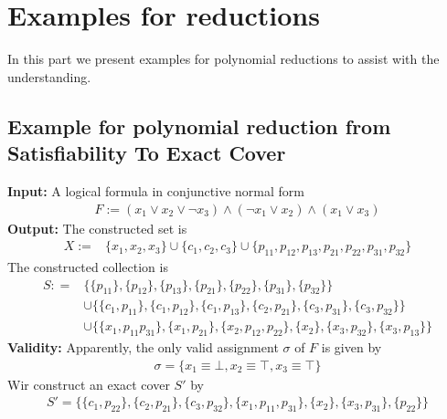 \chapter{Examples for reductions}
In this part we present examples for polynomial reductions to assist with the understanding. 
\section{Example for polynomial reduction from Satisfiability To Exact Cover}
\textbf{Input:} A logical formula in conjunctive normal form 
\begin{align*}
    F := (x_1 \lor x_2 \lor \neg x_3) \land (\neg x_1 \lor x_2) \land (x_1 \lor x_3)
\end{align*}
\textbf{Output:}
The constructed set is
\begin{align*}
    X := & \{ x_1 ,x_2, x_3\} \cup \{c_1, c_2, c_3\} \cup 
    \{p_{11}, p_{12}, p_{13}, p_{21}, p_{22}, p_{31}, p_{32}\}
\end{align*}
The constructed collection is 
\begin{align*}
    S : = & \{\{p_{11}\}, \{p_{12}\}, \{p_{13}\}, \{p_{21}\}, \{p_{22}\}, \{p_{31}\}, \{p_{32}\}\} \\
      & \cup  \{\{c_1, p_{11}\}, \{c_1, p_{12}\}, \{c_1, p_{13}\}, \{c_2, p_{21}\}, 
      \{c_3, p_{31}\}, \{c_3, p_{32}\}\} \\ 
      & \cup \{\{x_1, p_{11} p_{31}\}, \{x_1, p_{21}\}, \{x_2, p_{12}, p_{22}\}, \{x_2\},
      \{x_3, p_{32}\}, \{x_3, p_{13}\}\}
\end{align*}
\textbf{Validity:} Apparently, the only valid assignment $\sigma$ of $F$ is given by 
\begin{align*}
    \sigma = \{x_1 \equiv \bot, x_2 \equiv \top, x_3 \equiv \top \}
\end{align*}
Wir construct an exact cover $S'$ by 
\begin{align*}
    S' = \{\{c_1, p_{22}\}, \{c_2, p_{21}\}, \{c_3, p_{32}\},
    \{x_1, p_{11}, p_{31}\}, \{x_2\}, \{x_3, p_{31}\},
    \{p_{22}\}\}
\end{align*}

